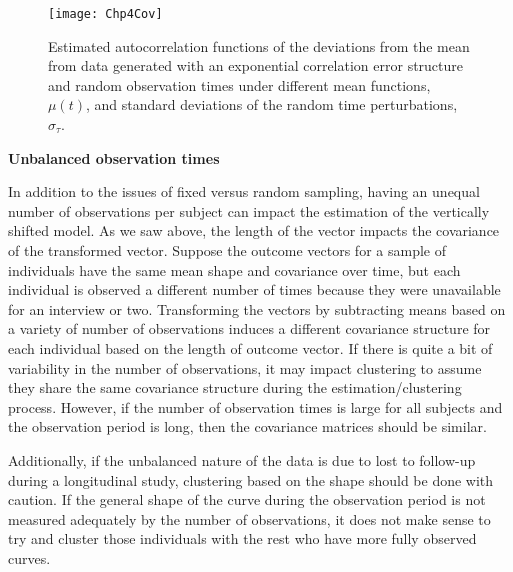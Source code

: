 \begin{landscape}
\begin{figure}
\centering
\texttt{[image: Chp4Cov]}
\caption{Estimated autocorrelation functions of the deviations from the mean from data generated with an exponential correlation error structure and random observation times under different mean functions, $\mu(t)$, and standard deviations of the random time perturbations, $\sigma_{\tau}$.}
\label{fig:cov}
\end{figure}
\end{landscape}

\noindent \textbf{Unbalanced observation times}

In addition to the issues of fixed versus random sampling, having an unequal number of observations per subject can impact the estimation of the vertically shifted model. As we saw above, the length of the vector impacts the covariance of the transformed vector. Suppose the outcome vectors for a sample of individuals have the same mean shape and covariance over time, but each individual is observed a different number of times because they were unavailable for an interview or two. Transforming the vectors by subtracting means based on a variety of number of observations induces a different covariance structure for each individual based on the length of outcome vector. If there is quite a bit of variability in the number of observations, it may impact clustering to assume they share the same covariance structure during the estimation/clustering process. However, if the number of observation times is large for all subjects and the observation period is long, then the covariance matrices should be similar. 

Additionally, if the unbalanced nature of the data is due to lost to follow-up during a longitudinal study, clustering based on the shape should be done with caution. If the general shape of the curve during the observation period is not measured adequately by the number of observations, it does not make sense to try and cluster those individuals with the rest who have more fully observed curves. 

